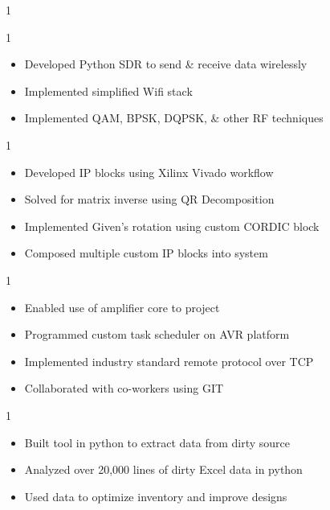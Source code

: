 \documentclass[10pt, letterpaper, ragged2e, withhyper]{AltaCV/altacv}
\def\RUWPTRX{1}		%
\def\RUSDR{1}		%
\def\RUXILINX{0}	%
\def\RSEAMP{0}		%
\def\RSDATA{0}		%
\begin{document}
\begin{paracol}{2}
\if\RUSDR1

\if\RUWPTRX1
\divider
\fi

\begin{itemize}
\item Developed Python SDR to send \& receive data wirelessly
\item Implemented simplified Wifi stack
\item Implemented QAM, BPSK, DQPSK, \& other RF techniques
\end{itemize}
\fi

\if\RUXILINX1


\begin{itemize}
\item Developed IP blocks using Xilinx Vivado workflow
\item Solved for matrix inverse using QR Decomposition
\item Implemented Given's rotation using custom CORDIC block
\item Composed multiple custom IP blocks into system
\end{itemize}
\fi

\if\RSEAMP1
\divider
{}
\begin{itemize}
\item Enabled use of amplifier core to project
\item Programmed custom task scheduler on AVR platform
\item Implemented industry standard remote protocol over TCP
\item Collaborated with co-workers using GIT
\end{itemize}
\fi

\if\RSDATA1

\divider

\begin{itemize}
\item Built tool in python to extract data from dirty source
\item Analyzed over 20,000 lines of dirty Excel data in python
\item Used data to optimize inventory and improve designs
\end{itemize}
\fi


\end{paracol}
\end{document}
